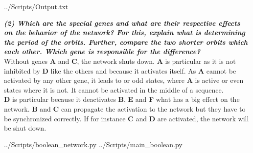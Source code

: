 \documentclass[10pt,a4paper]{article}
\begin{document}
\begin{enumerate}
\newpage
 {../Scripts/Output.txt}


\textbf{\textit{(2) Which are the special genes and what are their respective effects on the behavior of the
		network? For this, explain what is determining the period of the orbits. Further, compare
		the two shorter orbits which each other. Which gene is responsible for the difference?}}\\
	
	Without genes \textbf{A} and \textbf{C}, the network shuts down. \textbf{A} is particular as it is not inhibited by \textbf{D} like the others and because it activates itself. As \textbf{A} cannot be activated by any other gene, it leads to or odd states, where \textbf{A} is active or even states where it is not. It cannot be activated in the middle of a sequence. \\
	
	
	\textbf{D} is particular because it deactivates \textbf{B}, \textbf{E} and \textbf{F} what has a big effect on the network. \textbf{B} and \textbf{C} can propagate the activation to the network but they have to be synchronized correctly. If for instance \textbf{C} and \textbf{D} are activated, the network will be shut down. 
	
	



\end{enumerate}


\newpage
 {../Scripts/boolean\string_network.py}
\newpage
 {../Scripts/main\string_boolean.py}
\end{document}
